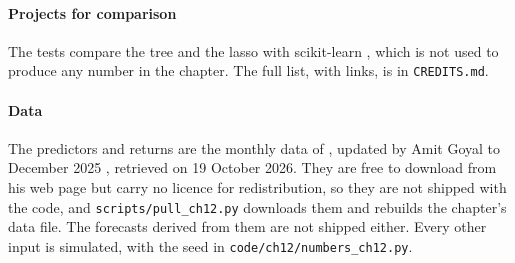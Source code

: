 \begin{chapterrefs}
\paragraph{Projects for comparison}
The tests compare the tree and the lasso with scikit-learn \parencite{sklearnsw,sklearn2011}, which
is not used to produce any number in the chapter. The full list, with links, is in \texttt{CREDITS.md}.

\paragraph{Data}
The predictors and returns are the monthly data of \textcite{welch2008}, updated by Amit Goyal to December
2025 \parencite{goyalch12}, retrieved on 19 October 2026. They are free to download from his web page but
carry no licence for redistribution, so they are not shipped with the code, and
\texttt{scripts/pull\_ch12.py} downloads them and rebuilds the chapter's data file. The forecasts derived
from them are not shipped either. Every other input is simulated, with the seed in
\texttt{code/ch12/numbers\_ch12.py}.

\end{chapterrefs}
